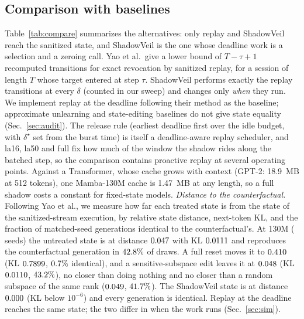 \documentclass[conference]{IEEEtran}
\begin{document}
\subsection{Comparison with baselines}
Table~\ref{tab:compare} summarizes the alternatives: only replay and ShadowVeil reach the sanitized state, and ShadowVeil is the one whose deadline work is a selection and a zeroing call.
Yao et al.\ give a lower bound of $T-\tau+1$ recomputed transitions for exact revocation by sanitized replay, for a session of length $T$ whose target entered at
step $\tau$. ShadowVeil performs exactly the replay transitions at every $\delta$ (counted in our sweep) and changes only \emph{when} they run.
We implement replay at the deadline following their method as the baseline; approximate unlearning and state-editing baselines do not give state equality (Sec.~\ref{sec:audit}). The release rule (earliest deadline first over the idle budget, with $\delta^\star$ set from the burst time) is itself a deadline-aware replay scheduler, and la16, la50 and full fix how much of the window the shadow rides along the batched step, so the comparison contains proactive replay at several operating points. Against a
Transformer, whose cache grows with context (GPT-2: 18.9~MB at 512 tokens), one Mamba-130M cache is
1.47~MB at any length, so a full shadow costs a constant for fixed-state models. \emph{Distance to the counterfactual.} Following Yao et al., we measure how far each treated state is from the state of the sanitized-stream execution, by relative state distance, next-token KL, and the fraction of matched-seed generations identical to the counterfactual's. At 130M (\nCfdSeedsA{} seeds) the untreated state is at distance $0.047$ with KL $0.0111$ and reproduces the counterfactual generation in $42.8\%$ of draws. A full reset moves it to $0.410$ (KL $0.7899$, $0.7\%$ identical), and a sensitive-subspace edit leaves it at $0.048$ (KL $0.0110$, $43.2\%$), no closer than doing nothing and no closer than a random subspace of the same rank ($0.049$, $41.7\%$). The ShadowVeil state is at distance $0.000$ (KL below $10^{-6}$) and every generation is identical. Replay at the deadline reaches the same state; the two differ in when the work runs (Sec.~\ref{sec:sim}).
\end{document}
